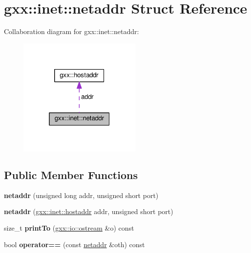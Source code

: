 \hypertarget{structgxx_1_1inet_1_1netaddr}{}\section{gxx\+:\+:inet\+:\+:netaddr Struct Reference}
\label{structgxx_1_1inet_1_1netaddr}


Collaboration diagram for gxx\+:\+:inet\+:\+:netaddr\+:
\nopagebreak
\begin{figure}[H]
\begin{center}
\leavevmode
\includegraphics[width=172pt]{structgxx_1_1inet_1_1netaddr__coll__graph}
\end{center}
\end{figure}
\subsection*{Public Member Functions}
\begin{DoxyCompactItemize}
\item 
{\bfseries netaddr} (unsigned long addr, unsigned short port)\hypertarget{structgxx_1_1inet_1_1netaddr_a7db37d2c311d45f1f4867569eb7c07c7}{}\label{structgxx_1_1inet_1_1netaddr_a7db37d2c311d45f1f4867569eb7c07c7}

\item 
{\bfseries netaddr} (\hyperlink{classgxx_1_1hostaddr}{gxx\+::inet\+::hostaddr} addr, unsigned short port)\hypertarget{structgxx_1_1inet_1_1netaddr_a3afc7a4e5424e16fbf3e73d87849d2a2}{}\label{structgxx_1_1inet_1_1netaddr_a3afc7a4e5424e16fbf3e73d87849d2a2}

\item 
size\+\_\+t {\bfseries print\+To} (\hyperlink{classgxx_1_1io_1_1ostream}{gxx\+::io\+::ostream} \&o) const \hypertarget{structgxx_1_1inet_1_1netaddr_af139de45b090b16543e8a50dcc8b445d}{}\label{structgxx_1_1inet_1_1netaddr_af139de45b090b16543e8a50dcc8b445d}

\item 
bool {\bfseries operator==} (const \hyperlink{structgxx_1_1inet_1_1netaddr}{netaddr} \&oth) const \hypertarget{structgxx_1_1inet_1_1netaddr_a2e83050ccb159ec57c4f5716a026a2be}{}\label{structgxx_1_1inet_1_1netaddr_a2e83050ccb159ec57c4f5716a026a2be}

\end{DoxyCompactItemize}
